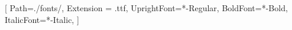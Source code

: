 \usepackage{fancyhdr}

\usepackage{graphicx}
\usepackage{float}              %
\usepackage{subcaption}         %

\usepackage{fontspec}           %
\setmainfont{Rosarivo}[
Path=./fonts/,                  %
Extension = .ttf,               %
UprightFont=*-Regular,          %
BoldFont=*-Bold,                %
ItalicFont=*-Italic,            %
]

\usepackage[hidelinks]{hyperref}

\usepackage{xcolor}